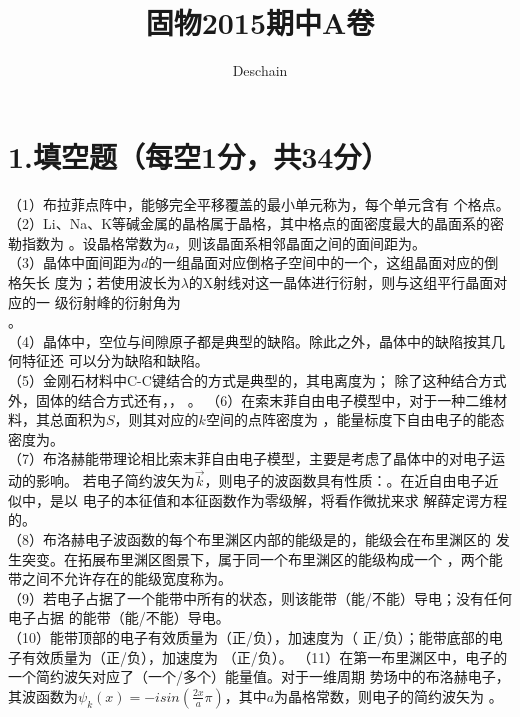 \documentclass[UTF8]{ctexart}
\title{固物2015期中A卷}
\author{Deschain}
\begin{document}
\maketitle
\section*{\bfseries 1.填空题（每空1分，共34分）}
（1）布拉菲点阵中，能够完全平移覆盖的最小单元称为\underline{\makebox[3em]{}}，每个单元含有
\underline{\makebox[2em]{}}个格点。\\
（2）Li、Na、K等碱金属的晶格属于\underline{\makebox[6em]{}}晶格，其中格点的面密度最大的晶面系的密勒指数为
\underline{\makebox[4em]{}}。设晶格常数为$a$，则该晶面系相邻晶面之间的面间距为\underline{\makebox[4em]{}}。\\
（3）晶体中面间距为$d$的一组晶面对应倒格子空间中的一个\underline{\makebox[3em]{}}，这组晶面对应的倒格矢长
度为\underline{\makebox[3em]{}}；若使用波长为$\lambda$的X射线对这一晶体进行衍射，则与这组平行晶面对应的一
级衍射峰的衍射角为\\
\underline{\makebox[9em]{}}。\\
（4）晶体中，空位与间隙原子都是典型的\underline{\makebox[2em]{}}缺陷。除此之外，晶体中的缺陷按其几何特征还
可以分为\underline{\makebox[2em]{}}缺陷和\underline{\makebox[2em]{}}缺陷。\\
（5）金刚石材料中C-C键结合的方式是典型的\underline{\makebox[6em]{}}，其电离度为\underline{\makebox[2em]{}}；
除了这种结合方式外，固体的结合方式还有\underline{\makebox[6em]{}}，\underline{\makebox[6em]{}}，
\underline{\makebox[9em]{}}。
（6）在索末菲自由电子模型中，对于一种二维材料，其总面积为$S$，则其对应的$k$空间的点阵密度为
\underline{\makebox[4em]{}}，能量标度下自由电子的能态密度为\underline{\makebox[4em]{}}。\\
（7）布洛赫能带理论相比索末菲自由电子模型，主要是考虑了晶体中的\underline{\makebox[8em]{}}对电子运动的影响。
若电子简约波矢为$\vec{k}$，则电子的波函数具有性质：\underline{\makebox[15em]{}}。在近自由电子近似中，是以
\underline{\makebox[3em]{}}电子的本征值和本征函数作为零级解，将\underline{\makebox[10em]{}}看作微扰来求
解薛定谔方程的。\\
（8）布洛赫电子波函数的每个布里渊区内部的能级是\underline{\makebox[4em]{}}的，能级会在布里渊区的
\underline{\makebox[3em]{}}发生突变。在拓展布里渊区图景下，属于同一个布里渊区的能级构成一个
\underline{\makebox[3em]{}}，两个能带之间不允许存在的能级宽度称为\underline{\makebox[3em]{}}。\\
（9）若电子占据了一个能带中所有的状态，则该能带\underline{\makebox[3em]{}}（能/不能）导电；没有任何电子占据
的能带\underline{\makebox[3em]{}}（能/不能）导电。\\
（10）能带顶部的电子有效质量为\underline{\makebox[2em]{}}（正/负），加速度为\underline{\makebox[2em]{}}（
正/负）；能带底部的电子有效质量为\underline{\makebox[2em]{}}（正/负），加速度为\underline{\makebox[2em]{}}
（正/负）。
（11）在第一布里渊区中，电子的一个简约波矢对应了\underline{\makebox[3em]{}}（一个/多个）能量值。对于一维周期
势场中的布洛赫电子，其波函数为$\psi_k(x)=-isin(\frac{2x}{a}\pi)$，其中$a$为晶格常数，则电子的简约波矢为
\underline{\makebox[2em]{}}。\\
\end{document}
